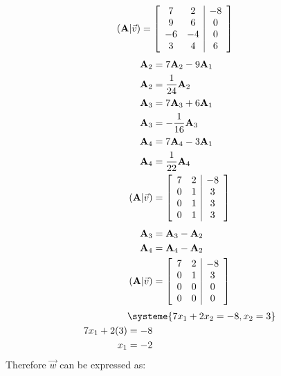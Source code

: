 \documentclass{article}
\begin{document}
\begin{align*}
	(\mathbf{A}|\vec{v}) & =
		\left[ \begin{array}{ c c | c }
			7 & 2 & -8 \\
			9 & 6 & 0 \\
			-6 & -4 & 0 \\
			3 & 4 & 6
		\end{array} \right]
\end{align*}
\begin{align*}
	\mathbf{A}_2 & = 7\mathbf{A}_2 - 9\mathbf{A}_1 \\
	\mathbf{A}_2 & = \frac{1}{24}\mathbf{A}_2 \\
	\mathbf{A}_3 & = 7\mathbf{A}_3 + 6\mathbf{A}_1 \\
	\mathbf{A}_3 & = -\frac{1}{16}\mathbf{A}_3 \\
	\mathbf{A}_4 & = 7\mathbf{A}_4 - 3\mathbf{A}_1 \\
	\mathbf{A}_4 & = \frac{1}{22}\mathbf{A}_4 \\
	(\mathbf{A}|\vec{v}) & =
		\left[ \begin{array}{ c c | c }
			7 & 2 & -8 \\
			0 & 1 & 3 \\
			0 & 1 & 3 \\
			0 & 1 & 3
		\end{array} \right]
\end{align*}
\begin{align*}
	\mathbf{A}_3 & = \mathbf{A}_3 - \mathbf{A}_2 \\
	\mathbf{A}_4 & = \mathbf{A}_4 - \mathbf{A}_2 \\
	(\mathbf{A}|\vec{v}) & =
		\left[ \begin{array}{ c c | c }
			7 & 2 & -8 \\
			0 & 1 & 3 \\
			0 & 0 & 0 \\
			0 & 0 & 0
		\end{array} \right]
\end{align*}
\begin{align*}
	& \systeme{
		7x_1 + 2x_2 = -8,
		x_2 = 3
	} \\
	7x_1 + 2(3) & = -8 \\
	x_1 & = -2
\end{align*}
Therefore $ \vec{w} $ can be expressed as:
\end{document}
